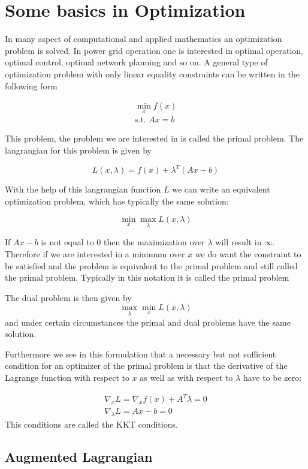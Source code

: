 

\section{Some basics in Optimization}
In many aspect of computational and applied mathematics an optimization problem is solved. In power grid operation one is interested in optimal operation, optimal control, optimal network planning and so on.
A general type of optimization problem with only linear equality constraints can be written in the following form

\begin{align}
\min_x f(x)\\
\mbox{s.t. }Ax=b 
\end{align}

This problem, the problem we are interested in is called the primal problem. The langrangian for this problem is given by 

\[L(x,\lambda)=f(x)+\lambda^T(Ax-b)\]

With the help of this langrangian function $L$ we can write an equivalent optimization problem, which has typically the same solution:

\[\min_x \max_{\lambda}  L(x,\lambda)\]

If $Ax-b$ is not equal to $0$ then the maximization over $\lambda$ will result in $\infty$. Therefore if we are interested in a minimum over $x$ we do want the constraint to be satisfied and the problem is equivalent to the primal problem and still called the primal problem. Typically in this notation it is called the primal problem

The dual problem is then given by
\[\max_{\lambda} \min_{x}  L(x,\lambda)\]
and under certain circumstances the primal and dual problems have the same solution. 

Furthermore we see in this formulation that a necessary but not sufficient condition for an optimizer of the primal problem is that the derivative of the Lagrange function with respect to $x$ as well as with respect to $\lambda$ have to be zero:

\begin{align}
\nabla_xL=\nabla_xf(x)+A^T\lambda=0\\
\nabla_{\lambda}L=Ax-b=0
\end{align}
This conditions are called the KKT conditions.

\subsection{Augmented Lagrangian}

